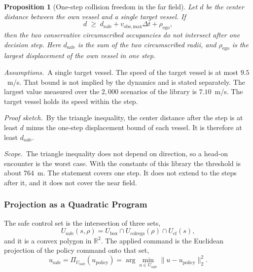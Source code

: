 \documentclass[10pt,letterpaper]{article}
\newtheorem{prop}{Proposition}
\begin{document}
\begin{prop}[One-step collision freedom in the far field]\label{prop:farfield}
Let $d$ be the center distance between the own vessel and a single target vessel. If
\begin{equation}
 d \;\ge\; d_{\mathrm{safe}} + v_{\mathrm{obs,max}}\Delta t + \rho_{\mathrm{ego}},
 \label{eq:farfield}
\end{equation}
then the two conservative circumscribed occupancies do not intersect after one decision
step. Here $d_{\mathrm{safe}}$ is the sum of the two circumscribed radii, and
$\rho_{\mathrm{ego}}$ is the largest displacement of the own vessel in one step.
\end{prop}

\noindent\textit{Assumptions.}\ A single target vessel. The speed of the target vessel is
at most $9.5$~m/s. That bound is not implied by the dynamics and is stated separately. The largest value
measured over the $2{,}000$ scenarios of the library is $7.10$~m/s. The
target vessel holds its speed within the step.

\noindent\textit{Proof sketch.}\ By the triangle inequality, the center distance after the
step is at least $d$ minus the one-step displacement bound of each vessel. It is therefore
at least $d_{\mathrm{safe}}$.

\noindent\textit{Scope.}\ The triangle inequality does not depend on direction, so a
head-on encounter is the worst case. With the constants of this library the threshold is
about $764$~m. The statement covers one step. It does not extend to the steps after it, and
it does not cover the near field.

\subsubsection{Projection as a Quadratic Program}

The safe control set is the intersection of three sets,
\begin{equation}
 U_{\mathrm{safe}}(s,\rho)=U_{\mathrm{box}}\cap U_{\mathrm{colregs}}(\rho)\cap U_{\mathrm{cf}}(s),
 \label{eq:safeset}
\end{equation}
and it is a convex polygon in $\mathbb{R}^2$. The applied command is the Euclidean
projection of the policy command onto that set,
\begin{equation}
 u_{\mathrm{safe}}=\Pi_{U_{\mathrm{safe}}}(u_{\mathrm{policy}})
 =\arg\min_{u\in U_{\mathrm{safe}}}\lVert u-u_{\mathrm{policy}}\rVert_2^2 .
 \label{eq:qp}
\end{equation}
\end{document}
